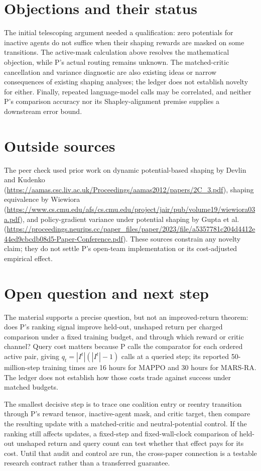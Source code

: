 \documentclass{article}
\begin{document}
\section{Objections and their status}

The initial telescoping argument needed a qualification: zero potentials for inactive agents do not suffice when their shaping rewards are masked on some transitions. The active-mask calculation above resolves the mathematical objection, while P's actual routing remains unknown. The matched-critic cancellation and variance diagnostic are also existing ideas or narrow consequences of existing shaping analyses; the ledger does not establish novelty for either. Finally, repeated language-model calls may be correlated, and neither P's comparison accuracy nor its Shapley-alignment premise supplies a downstream error bound. 

\section{Outside sources}

The peer check used prior work on dynamic potential-based shaping by Devlin and Kudenko
(\url{https://aamas.csc.liv.ac.uk/Proceedings/aamas2012/papers/2C_3.pdf}),
shaping equivalence by Wiewiora
(\url{https://www.cs.cmu.edu/afs/cs.cmu.edu/project/jair/pub/volume19/wiewiora03a.pdf}),
and policy-gradient variance under potential shaping by Gupta et al.
(\url{https://proceedings.neurips.cc/paper_files/paper/2023/file/a5357781c204d4412e44ed9cbcdb08d5-Paper-Conference.pdf}).
These sources constrain any novelty claim; they do not settle P's open-team implementation or its cost-adjusted empirical effect. 

\section{Open question and next step}

The material supports a precise question, but not an improved-return theorem: does P's ranking signal improve held-out, unshaped return per charged comparison under a fixed training budget, and through which reward or critic channel? Query cost matters because P calls the comparator for each ordered active pair, giving \(q_t=|I^t|(|I^t|-1)\) calls at a queried step; its reported 50-million-step training times are 16 hours for MAPPO and 30 hours for MARS-RA. The ledger does not establish how those costs trade against success under matched budgets. 

The smallest decisive step is to trace one coalition entry or reentry transition through P's reward tensor, inactive-agent mask, and critic target, then compare the resulting update with a matched-critic and neutral-potential control. If the ranking still affects updates, a fixed-step and fixed-wall-clock comparison of held-out unshaped return and query count can test whether that effect pays for its cost. Until that audit and control are run, the cross-paper connection is a testable research contract rather than a transferred guarantee. 
\end{document}
